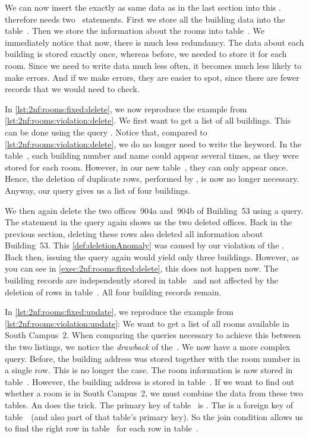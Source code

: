 We can now insert the exactly as same data as in the last section into this \db.
 therefore needs two~ statements.
First we store all the building data into the table~.
Then we store the information about the rooms into table~.
We immediately notice that now, there is much less redundancy.
The data about each building is stored exactly once, whereas before, we needed to store it for each room.
Since we need to write data much less often, it becomes much less likely to make errors.
And if we make errors, they are easier to spot, since there are fewer records that we would need to check.

In \cref{lst:2nf:rooms:fixed:delete}, we now reproduce the example from \cref{lst:2nf:rooms:violation:delete}.
We first want to get a list of all buildings.
This can be done using the query .
Notice that, compared to \cref{lst:2nf:rooms:violation:delete}, we do no longer need to write the  keyword.
In the table~, each building number and name could appear several times, as they were stored for each room.
However, in our new table~, they can only appear once.
Hence, the deletion of duplicate rows, performed by , is now no longer necessary.
Anyway, our query gives us a list of four buildings.

We then again delete the two offices~904a and~904b of Building~53 using a  query.
The  statement in the query again shows us the two deleted offices.
Back in the previous section, deleting these rows also deleted all information about Building~53.
This \cref{def:deletionAnomaly} was caused by our violation of the .
Back then, issuing the  query again would yield only three buildings.
However, as you can see in \cref{exec:2nf:rooms:fixed:delete}, this does not happen now.
The building records are independently stored in table~ and not affected by the deletion of rows in table~.
All four building records remain.

In \cref{lst:2nf:rooms:fixed:update}, we reproduce the example from \cref{lst:2nf:rooms:violation:update}:
We want to get a list of all rooms available in South Campus~2.
When comparing the queries necessary to achieve this between the two listings, we notice the \emph{drawback} of the~.
We now have a more complex query.
Before, the building address was stored together with the room number in a single row.
This is no longer the case.
The room information is now stored in table~.
However, the building address is stored in table~.
If we want to find out whether a room is in South Campus~2, we must combine the data from these two tables.
An  does the trick.
The primary key of table~ is .
The  is a foreign key of table~~(and also part of that table's primary key).
So the join condition  allows us to find the right row in table~ for each row in table~.

